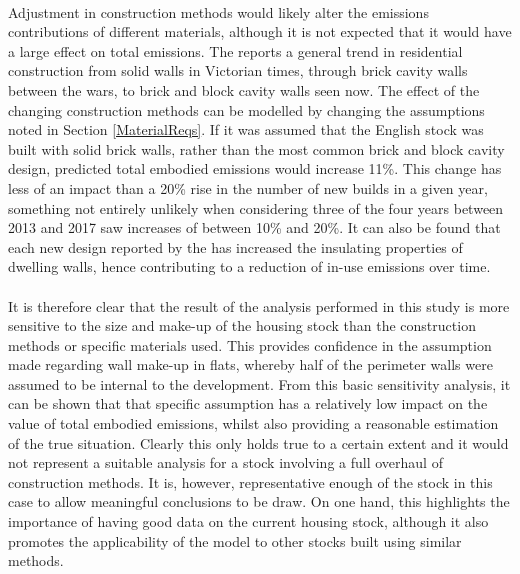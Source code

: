 \documentclass[12pt]{article}
\begin{document}
\paragraph{}
Adjustment in construction methods would likely alter the emissions contributions of different materials, although it is not expected that it would have a large effect on total emissions. The \citet{nhbc_2015-cg} reports a general trend in residential construction from solid walls in Victorian times, through brick cavity walls between the wars, to brick and block cavity walls seen now. The effect of the changing construction methods can be modelled by changing the assumptions noted in Section \ref{MaterialReqs}. If it was assumed that the English stock was built with solid brick walls, rather than the most common brick and block cavity design, predicted total embodied emissions would increase 11\%. This change has less of an impact than a 20\% rise in the number of new builds in a given year, something not entirely unlikely when considering three of the four years between 2013 and 2017 saw increases of between 10\% and 20\%. It can also be found that each new design reported by the \citet{nhbc_2015-cg} has increased the insulating properties of dwelling walls, hence contributing to a reduction of in-use emissions over time. 

\paragraph{}
It is therefore clear that the result of the analysis performed in this study is more sensitive to the size and make-up of the housing stock than the construction methods or specific materials used. This provides confidence in the assumption made regarding wall make-up in flats, whereby half of the perimeter walls were assumed to be internal to the development. From this basic sensitivity analysis, it can be shown that that specific assumption has a relatively low impact on the value of total embodied emissions, whilst also providing a reasonable estimation of the true situation. Clearly this only holds true to a certain extent and it would not represent a suitable analysis for a stock involving a full overhaul of construction methods. It is, however, representative enough of the stock in this case to allow meaningful conclusions to be draw. On one hand, this highlights the importance of having good data on the current housing stock, although it also promotes the applicability of the model to other stocks built using similar methods.
\end{document}

